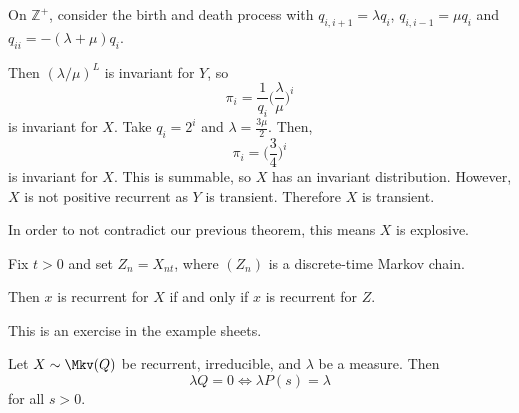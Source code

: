 \documentclass[12pt]{article}
\begin{document}
\begin{exbox}
	On $\mathbb{Z}^{+}$, consider the birth and death process with $q_{i,i+1} = \lambda q_i$, $q_{i,i-1} = \mu q_i$ and $q_{ii} = - (\lambda + \mu) q_i$.

	Then $(\lambda/\mu)^{L}$ is invariant for $Y$, so
	\[
	\pi_i = \frac{1}{q_i} \biggl( \frac{\lambda}{\mu} \biggr)^{i}
	\]
	is invariant for $X$. Take $q_i = 2^{i}$ and $\lambda = \frac{3\mu}{2}$. Then,
	\[
	\pi_i = \biggl( \frac{3}{4} \biggr)^{i}
	\]
	is invariant for $X$. This is summable, so $X$ has an invariant distribution. However, $X$ is not positive recurrent as $Y$ is transient. Therefore $X$ is transient.

	In order to not contradict our previous theorem, this means $X$ is explosive.
\end{exbox}

\begin{lemma}
	Fix $t > 0$ and set $Z_n = X_{nt}$, where $(Z_n)$ is a discrete-time Markov chain.

	Then $x$ is recurrent for $X$ if and only if $x$ is recurrent for $Z$.
\end{lemma}

This is an exercise in the example sheets.

\begin{theorem}
	Let $X \sim \Mkv(Q)$ be recurrent, irreducible, and $\lambda$ be a measure. Then
	\[
	\lambda Q = 0 \iff \lambda P(s) = \lambda
	\]
	for all $s > 0$.
\end{theorem}
\end{document}

